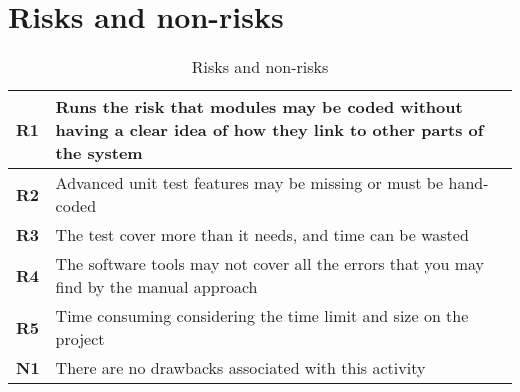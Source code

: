 \section{Risks and non-risks}

\begin{table}[H]
\small
\begin{tabular}{| p{} | p{} |} \hline
{\bf R1} & Runs the risk that modules may be coded without having a clear idea of how they link to other parts of the system \\ \hline
{\bf R2} & Advanced unit test features may be missing or must be hand-coded \\ \hline
{\bf R3} & The test cover more than it needs, and time can be wasted \\ \hline
{\bf R4} & The software tools may not cover all the errors that you may find by the manual approach\\ \hline
{\bf R5} & Time consuming considering the time limit and size on the project \\ \hline
{\bf N1} & There are no drawbacks associated with this activity \\ \hline
\end{tabular}
\caption{Risks and non-risks}
\end{table}





